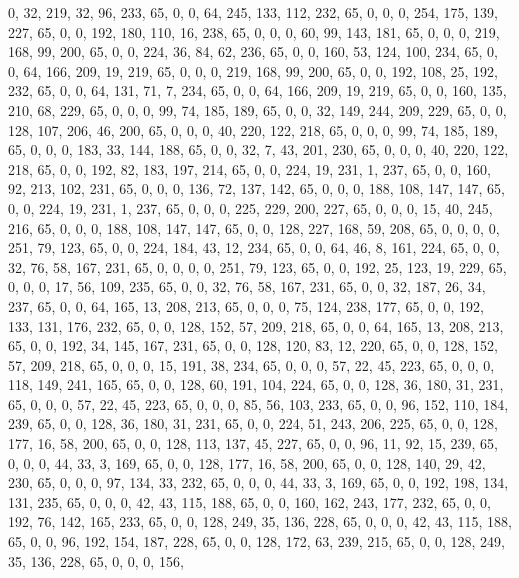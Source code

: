 \begin{DoxyCode}
       0, 32, 219, 32, 96, 233, 65, 0, 0, 64, 245, 133, 112, 232, 65, 0, 0, 0, 254, 175, 139, 227, 65, 0, 0, 192,
       180, 110, 16, 238, 65, 0, 0, 0, 60, 99, 143, 181, 65, 0, 0, 0, 219, 168, 99, 200, 65, 0, 0, 224, 36, 84, 62,
       236, 65, 0, 0, 160, 53, 124, 100, 234, 65, 0, 0, 64, 166, 209, 19, 219, 65, 0, 0, 0, 219, 168, 99, 200, 65,
       0, 0, 192, 108, 25, 192, 232, 65, 0, 0, 64, 131, 71, 7, 234, 65, 0, 0, 64, 166, 209, 19, 219, 65, 0, 0, 160,
       135, 210, 68, 229, 65, 0, 0, 0, 99, 74, 185, 189, 65, 0, 0, 32, 149, 244, 209, 229, 65, 0, 0, 128, 107, 206,
       46, 200, 65, 0, 0, 0, 40, 220, 122, 218, 65, 0, 0, 0, 99, 74, 185, 189, 65, 0, 0, 0, 183, 33, 144, 188, 65,
       0, 0, 32, 7, 43, 201, 230, 65, 0, 0, 0, 40, 220, 122, 218, 65, 0, 0, 192, 82, 183, 197, 214, 65, 0, 0, 224,
       19, 231, 1, 237, 65, 0, 0, 160, 92, 213, 102, 231, 65, 0, 0, 0, 136, 72, 137, 142, 65, 0, 0, 0, 188, 108,
       147, 147, 65, 0, 0, 224, 19, 231, 1, 237, 65, 0, 0, 0, 225, 229, 200, 227, 65, 0, 0, 0, 15, 40, 245, 216, 65,
       0, 0, 0, 188, 108, 147, 147, 65, 0, 0, 128, 227, 168, 59, 208, 65, 0, 0, 0, 0, 251, 79, 123, 65, 0, 0, 224,
       184, 43, 12, 234, 65, 0, 0, 64, 46, 8, 161, 224, 65, 0, 0, 32, 76, 58, 167, 231, 65, 0, 0, 0, 0, 251, 79,
       123, 65, 0, 0, 192, 25, 123, 19, 229, 65, 0, 0, 0, 17, 56, 109, 235, 65, 0, 0, 32, 76, 58, 167, 231, 65, 0,
       0, 32, 187, 26, 34, 237, 65, 0, 0, 64, 165, 13, 208, 213, 65, 0, 0, 0, 75, 124, 238, 177, 65, 0, 0, 192, 133,
       131, 176, 232, 65, 0, 0, 128, 152, 57, 209, 218, 65, 0, 0, 64, 165, 13, 208, 213, 65, 0, 0, 192, 34, 145,
       167, 231, 65, 0, 0, 128, 120, 83, 12, 220, 65, 0, 0, 128, 152, 57, 209, 218, 65, 0, 0, 0, 15, 191, 38, 234,
       65, 0, 0, 0, 57, 22, 45, 223, 65, 0, 0, 0, 118, 149, 241, 165, 65, 0, 0, 128, 60, 191, 104, 224, 65, 0, 0,
       128, 36, 180, 31, 231, 65, 0, 0, 0, 57, 22, 45, 223, 65, 0, 0, 0, 85, 56, 103, 233, 65, 0, 0, 96, 152, 110,
       184, 239, 65, 0, 0, 128, 36, 180, 31, 231, 65, 0, 0, 224, 51, 243, 206, 225, 65, 0, 0, 128, 177, 16, 58, 200,
       65, 0, 0, 128, 113, 137, 45, 227, 65, 0, 0, 96, 11, 92, 15, 239, 65, 0, 0, 0, 44, 33, 3, 169, 65, 0, 0, 128,
       177, 16, 58, 200, 65, 0, 0, 128, 140, 29, 42, 230, 65, 0, 0, 0, 97, 134, 33, 232, 65, 0, 0, 0, 44, 33, 3,
       169, 65, 0, 0, 192, 198, 134, 131, 235, 65, 0, 0, 0, 42, 43, 115, 188, 65, 0, 0, 160, 162, 243, 177, 232, 65,
       0, 0, 192, 76, 142, 165, 233, 65, 0, 0, 128, 249, 35, 136, 228, 65, 0, 0, 0, 42, 43, 115, 188, 65, 0, 0,
       96, 192, 154, 187, 228, 65, 0, 0, 128, 172, 63, 239, 215, 65, 0, 0, 128, 249, 35, 136, 228, 65, 0, 0, 0, 156,

\end{DoxyCode}
